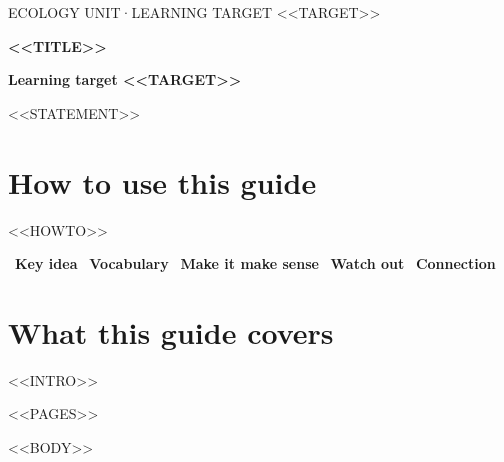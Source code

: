 \documentclass[11pt,letterpaper]{article}
\begin{document}
\thispagestyle{empty}
{\sffamily\small\color{forest} ECOLOGY UNIT\quad·\quad LEARNING TARGET <<TARGET>>\par}
\vspace{4pt}
{\raggedright\sffamily\bfseries\huge\color{forest} <<TITLE>>\par}
\vspace{10pt}
\begin{tcolorbox}[colback=pale,colframe=forest,boxrule=0.6pt,arc=2pt,left=10pt,right=10pt,top=8pt,bottom=8pt]
{\sffamily\bfseries\color{forest} Learning target <<TARGET>>}\par
\large <<STATEMENT>>
\end{tcolorbox}

\section{How to use this guide}
<<HOWTO>>

\medskip
{\sffamily\small
{}~\textcolor{keyc}{\textbf{Key idea}}\quad
{}~\textcolor{vocabc}{\textbf{Vocabulary}}\quad
{}~\textcolor{tipc}{\textbf{Make it make sense}}\quad
{}~\textcolor{watchc}{\textbf{Watch out}}\quad
{}~\textcolor{linkc}{\textbf{Connection}}\par}

\section{What this guide covers}
<<INTRO>>

\clearpage
<<PAGES>>

<<BODY>>
\end{document}
